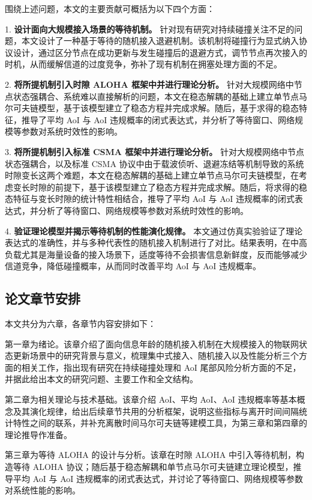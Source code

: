 围绕上述问题，本文的主要贡献可概括为以下四个方面：

1. \textbf{设计面向大规模接入场景的等待机制。} 针对现有研究对持续碰撞关注不足的问题，本文设计了一种基于等待的随机接入退避机制。该机制将碰撞行为显式纳入协议设计，通过区分节点在成功更新与发生碰撞后的退避方式，调节节点再次接入的时机，从而缓解信道的过度竞争，弥补了现有机制在拥塞处理方面的不足。

2. \textbf{将所提机制引入时隙 ALOHA 框架中并进行理论分析。} 针对大规模网络中节点状态强耦合、系统难以直接解析的问题，本文在稳态解耦的基础上建立单节点马尔可夫链模型，基于该模型建立了稳态方程并完成求解。随后，基于求得的稳态特征，推导了平均 AoI 与 AoI 违规概率的闭式表达式，并分析了等待窗口、网络规模等参数对系统时效性的影响。

3. \textbf{将所提机制引入标准 CSMA 框架中并进行理论分析。} 针对大规模网络中节点状态强耦合，以及标准 CSMA 协议中由于载波侦听、退避冻结等机制导致的系统时隙变长这两个难题，本文在稳态解耦的基础上建立单节点马尔可夫链模型，在考虑变长时隙的前提下，基于该模型建立了稳态方程并完成求解。随后，将求得的稳态特征与变长时隙的统计特性相结合，推导了平均 AoI 与 AoI 违规概率的闭式表达式，并分析了等待窗口、网络规模等参数对系统时效性的影响。

4. \textbf{验证理论模型并揭示等待机制的性能演化规律。} 本文通过仿真实验验证了理论表达式的准确性，并与多种代表性的随机接入机制进行了对比。结果表明，在中高负载尤其是海量设备的接入场景下，适度等待不会损害信息新鲜度，反而能够减少信道竞争，降低碰撞概率，从而同时改善平均 AoI 与 AoI 违规概率。

\subsection{论文章节安排}

本文共分为六章，各章节内容安排如下：

第一章为绪论。该章介绍了面向信息年龄的随机接入机制在大规模接入的物联网状态更新场景中的研究背景与意义，梳理集中式接入、随机接入以及性能分析三个方面的相关工作，指出现有研究在持续碰撞处理和 AoI 尾部风险分析方面的不足，并据此给出本文的研究问题、主要工作和全文结构。

第二章为相关理论与技术基础。该章介绍 AoI、平均 AoI、AoI 违规概率等基本概念及其演化规律，给出后续章节共用的分析框架，说明这些指标与离开时间间隔统计特性之间的联系，并补充离散时间马尔可夫链等建模工具，为第三章和第四章的理论推导作准备。

第三章为等待 ALOHA 的设计与分析。该章在时隙 ALOHA 中引入等待机制，构造等待 ALOHA 协议；随后基于稳态解耦和单节点马尔可夫链建立理论模型，推导平均 AoI 与 AoI 违规概率的闭式表达式，并讨论了等待窗口、网络规模等参数对系统性能的影响。


